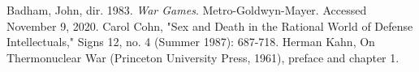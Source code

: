 \documentclass[12pt]{turabian-researchpaper}
\begin{document}
\newpage
\begin{thebibliography}{1}
	 Badham, John, dir. 1983. \textit{War Games}. Metro-Goldwyn-Mayer. Accessed November 9, 2020.
	 Carol Cohn, "Sex and Death in the Rational World of Defense Intellectuals," Signs 12, no. 4 (Summer 1987): 687-718.
	 Herman Kahn, On Thermonuclear War (Princeton University Press, 1961), preface and chapter 1.
\end{thebibliography}
\end{document}
